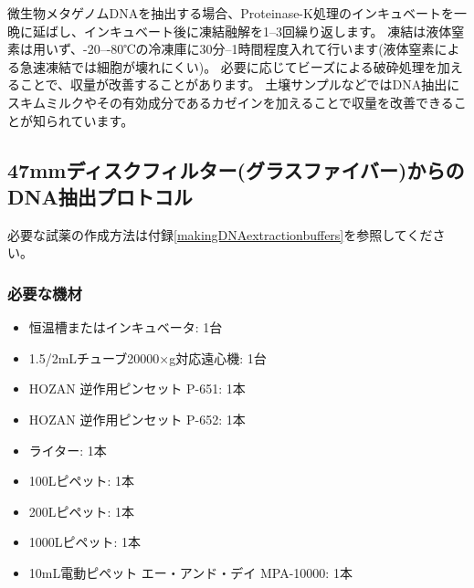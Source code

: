\documentclass[titlepage,10pt,a4paper]{jsbook}
\begin{document}
微生物メタゲノムDNAを抽出する場合、Proteinase-K処理のインキュベートを一晩に延ばし、インキュベート後に凍結融解を1--3回繰り返します。
凍結は液体窒素は用いず、{-20}--{-80}℃の冷凍庫に30分--1時間程度入れて行います(液体窒素による急速凍結では細胞が壊れにくい)。
必要に応じてビーズによる破砕処理を加えることで、収量が改善することがあります。
土壌サンプルなどではDNA抽出にスキムミルクやその有効成分であるカゼインを加えることで収量を改善できることが知られています\citep{Takada-Hoshino2004,Wang2012}。

\subsection{47mmディスクフィルター(グラスファイバー)からのDNA抽出プロトコル}

必要な試薬の作成方法は付録\ref{makingDNAextractionbuffers}を参照してください。

\subsubsection{必要な機材}
\begin{itemize}
\item 恒温槽またはインキュベータ: 1台
\item 1.5/2mLチューブ20000×g対応遠心機: 1台
\item HOZAN 逆作用ピンセット P-651: 1本
\item HOZAN 逆作用ピンセット P-652: 1本
\item ライター: 1本
\item 100{\textmu}Lピペット: 1本
\item 200{\textmu}Lピペット: 1本
\item 1000{\textmu}Lピペット: 1本
\item 10mL電動ピペット エー・アンド・デイ MPA-10000: 1本
\end{itemize}
\end{document}
